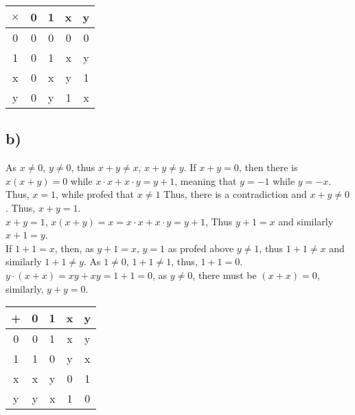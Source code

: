 \documentclass{article}
\begin{document}
\begin{table*}[h]
    \centering
    \begin{tabular}{|c|c|c|c|c|}
        \hline
        \(\times\)&0&1&x&y\\ \hline
        0&0&0&0&0\\ \hline
        1&0&1&x&y\\ \hline
        x&0&x&y&1\\ \hline
        y&0&y&1&x\\ \hline
    \end{tabular}
\end{table*}

\subsection*{b)}
As \(x\neq 0\), \(y\neq 0\), thus \(x+y\neq x\), \(x+y\neq y\). If \(x+y=0\), then there is
\(x(x+y)=0\) while \(x\cdot x + x\cdot y = y+1\), meaning that \(y=-1\) while \(y=-x\). Thus, \(x=1\), while profed that \(x\neq 1\)
Thus, there is a contradiction and \(x+y\neq 0\). Thus, \(x+y=1\).\\
\(x+y=1\), \(x(x+y)=x=x\cdot x + x\cdot y = y+1\), Thus \(y+1=x\) and similarly \( x+1 = y\).\\
If \(1+1 = x\), then, as \(y+1=x\), \(y=1\) as profed above \(y\neq1\), thus \(1+1\neq x\) and similarly \(1+1\neq y\). As \(1\neq 0\), \(1+1\neq 1\),
thus, \(1+1=0\).\\
\(y\cdot(x+x)=xy+xy=1+1=0\), as \(y\neq0\), there must be \((x+x)=0\), similarly, \(y+y=0\).
\begin{table*}[h]
    \centering
    \begin{tabular}{|c|c|c|c|c|}
        \hline
        +&0&1&x&y\\ \hline
        0&0&1&x&y\\ \hline
        1&1&0&y&x\\ \hline
        x&x&y&0&1\\ \hline
        y&y&x&1&0\\ \hline
    \end{tabular}
\end{table*}
\end{document}
